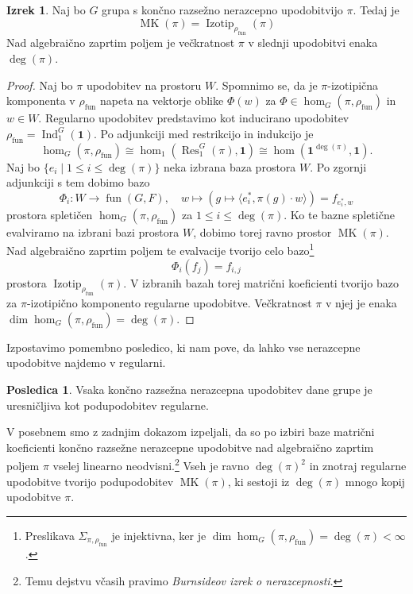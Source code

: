 \documentclass[11pt]{book}
\def\oneone{\mathbf{1}}
\DeclareMathOperator\Res{Res}
\DeclareMathOperator\Ind{Ind}
\DeclareMathOperator\Izotip{Izotip}
\DeclareMathOperator\MK{MK}
\DeclareMathOperator\fun{fun}
\theoremstyle{definition}
\theoremstyle{zgled}
\theoremstyle{zgledbrezstevilke}
\theoremstyle{odprtproblem}
\theoremstyle{domacanaloga}
\newenvironment{dokaz}
    {\color{siva}\begin{proof}}
    {\end{proof}}
\theoremstyle{izrek}
\newtheorem{izrek}[theorem]{Izrek}
\newtheorem{posledica}[theorem]{Posledica}
\begin{document}
\begin{izrek}
Naj bo $G$ grupa s končno razsežno nerazcepno upodobitvijo $\pi$. Tedaj je
\[
   \textstyle  \MK(\pi) = \Izotip_{\rho_{\fun}}(\pi)
\]
Nad algebraično zaprtim poljem je večkratnost $\pi$ v slednji upodobitvi enaka $\deg(\pi)$.
\end{izrek}
\begin{dokaz}
Naj bo $\pi$ upodobitev na prostoru $W$. Spomnimo se, da je $\pi$-izotipična komponenta v $\rho_{\fun}$ napeta na vektorje oblike $\Phi(w)$ za $\Phi \in \hom_G(\pi, \rho_{\fun})$ in $w \in W$. Regularno upodobitev predstavimo kot inducirano upodobitev $\rho_{\fun} = \Ind^G_1(\oneone)$. Po adjunkciji med restrikcijo in indukcijo je
\[
    \textstyle \hom_G(\pi, \rho_{\fun}) \cong \hom_1(\Res^G_1(\pi), \oneone)
    \cong \hom(\oneone^{\deg(\pi)}, \oneone).
\]
Naj bo $\{ e_i \mid 1 \leq i \leq \deg(\pi) \}$ neka izbrana baza prostora $W$. Po zgornji adjunkciji s tem dobimo bazo
\[
    \Phi_i \colon W \to \fun(G,F), \quad
    w \mapsto \left( g \mapsto \langle e_i^*, \pi(g) \cdot w \rangle \right) = f_{e_i^*, w}
\]
prostora spletičen $\hom_G(\pi, \rho_{\fun})$ za $1 \leq i \leq \deg(\pi)$. Ko te bazne spletične evalviramo na izbrani bazi prostora $W$, dobimo torej ravno prostor $\MK(\pi)$. Nad algebraično zaprtim poljem te evalvacije tvorijo celo bazo\footnote{Preslikava $\Sigma_{\pi, \rho_{\fun}}$ je injektivna, ker je $\dim \hom_G(\pi, \rho_{\fun}) = \deg(\pi) < \infty$.}
\[
    \Phi_i(f_j) = f_{i,j}
\]
prostora $\Izotip_{\rho_{\fun}}(\pi)$. V izbranih bazah torej matrični koeficienti tvorijo bazo za $\pi$-izotipično komponento regularne upodobitve. Večkratnost $\pi$ v njej je enaka $\dim \hom_G(\pi, \rho_{\fun}) = \deg(\pi)$.
\end{dokaz}

Izpostavimo pomembno posledico, ki nam pove, da lahko vse nerazcepne upodobitve najdemo v regularni.

\begin{posledica}
Vsaka končno razsežna nerazcepna upodobitev dane grupe je uresničljiva kot podupodobitev regularne.
\end{posledica}

V posebnem smo z zadnjim dokazom izpeljali, da so po izbiri baze matrični koeficienti končno razsežne nerazcepne upodobitve nad algebraično zaprtim poljem $\pi$ vselej linearno neodvisni.\footnote{Temu dejstvu včasih pravimo \emph{Burnsideov izrek o nerazcepnosti}.} Vseh je ravno $\deg(\pi)^2$ in znotraj regularne upodobitve tvorijo podupodobitev $\MK(\pi)$, ki sestoji iz $\deg(\pi)$ mnogo kopij upodobitve $\pi$.
\end{document}
